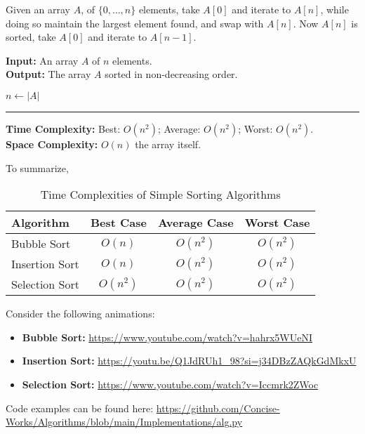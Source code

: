 \begin{Func}
    Given an array $A$, of $\{0,\ldots,n\}$ elements, take $A[0]$ and iterate to $A[n]$, while doing so
    maintain the largest element found, and swap with $A[n]$. Now $A[n]$ is sorted, take $A[0]$
    and iterate to $A[n-1]$.

    \vspace{.5em}
    \noindent
    \textbf{Input:} An array $A$ of $n$ elements.\\
    \textbf{Output:} The array $A$ sorted in non-decreasing order.\\
    \begin{algorithm}[H]
        \SetAlgoLined
        $n \gets |A|$\;
    \end{algorithm}

    \noindent
    \rule{\textwidth}{0.4pt}
    \noindent
    \textbf{Time Complexity:} Best: $O(n^2)$;  
    Average: $O(n^2)$;  
    Worst: $O(n^2)$.\\
    \textbf{Space Complexity:} $O(n)$ the array itself.
\end{Func}

\noindent
To summarize,
\begin{table}[h]
    \centering
    \begin{tabular}{|l|c|c|c|}
        \hline
        \textbf{Algorithm} & \textbf{Best Case} & \textbf{Average Case} & \textbf{Worst Case} \\
        \hline
        Bubble Sort     & $O(n)$     & $O(n^2)$   & $O(n^2)$   \\
        Insertion Sort  & $O(n)$     & $O(n^2)$   & $O(n^2)$   \\
        Selection Sort  & $O(n^2)$   & $O(n^2)$   & $O(n^2)$   \\
        \hline
    \end{tabular}
    \caption{Time Complexities of Simple Sorting Algorithms}
\end{table}

\begin{Tip} Consider the following animations:
    \begin{itemize}
        \item \textbf{Bubble Sort:} \url{https://www.youtube.com/watch?v=hahrx5WUeNI}
        \item \textbf{Insertion Sort:} \url{https://youtu.be/Q1JdRUh1_98?si=j34DBzZAQkGdMkxU}
        \item \textbf{Selection Sort:} \url{https://www.youtube.com/watch?v=Iccmrk2ZWoc}
    \end{itemize}

    \noindent
    Code examples can be found here: \url{https://github.com/Concise-Works/Algorithms/blob/main/Implementations/alg.py}
\end{Tip}

